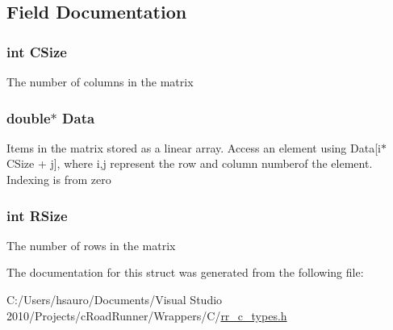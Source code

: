\subsection{\-Field \-Documentation}
\hypertarget{struct_r_r_matrix_a17c9a5894aa9cb3789346dcaa9c370bb}{
\subsubsection[{\-C\-Size}]{\setlength{\rightskip}{0pt plus 5cm}int {\bf \-C\-Size}}}
\label{struct_r_r_matrix_a17c9a5894aa9cb3789346dcaa9c370bb}
\-The number of columns in the matrix \hypertarget{struct_r_r_matrix_a7c5cbda3aa940f4b0d6e8a1679307dfc}{
\subsubsection[{\-Data}]{\setlength{\rightskip}{0pt plus 5cm}double$\ast$ {\bf \-Data}}}
\label{struct_r_r_matrix_a7c5cbda3aa940f4b0d6e8a1679307dfc}
\-Items in the matrix stored as a linear array. \-Access an element using \-Data\mbox{[}i$\ast$\-C\-Size + j\mbox{]}, where i,j represent the row and column numberof the element. \-Indexing is from zero \hypertarget{struct_r_r_matrix_a4d8512c879223c0e0d1522dae38e7819}{
\subsubsection[{\-R\-Size}]{\setlength{\rightskip}{0pt plus 5cm}int {\bf \-R\-Size}}}
\label{struct_r_r_matrix_a4d8512c879223c0e0d1522dae38e7819}
\-The number of rows in the matrix 

\-The documentation for this struct was generated from the following file\-:\begin{DoxyCompactItemize}
\item 
\-C\-:/\-Users/hsauro/\-Documents/\-Visual Studio 2010/\-Projects/c\-Road\-Runner/\-Wrappers/\-C/\hyperlink{rr__c__types_8h}{rr\-\_\-c\-\_\-types.\-h}\end{DoxyCompactItemize}
